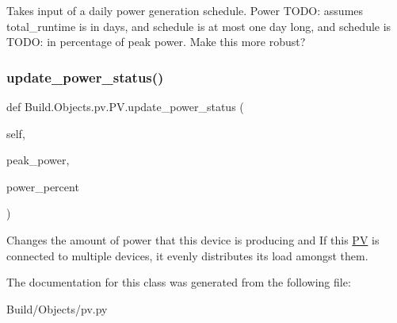 Takes input of a daily power generation schedule. Power T\+O\+DO\+: assumes total\+\_\+runtime is in days, and schedule is at most one day long, and schedule is T\+O\+DO\+: in percentage of peak power. Make this more robust? \mbox{\label{class_build_1_1_objects_1_1pv_1_1_p_v_a0c27298b51f1e227cee28bb3f6528742}} 
\subsubsection{\texorpdfstring{update\+\_\+power\+\_\+status()}{update\_power\_status()}}
{\footnotesize\ttfamily def Build.\+Objects.\+pv.\+P\+V.\+update\+\_\+power\+\_\+status (\begin{DoxyParamCaption}\item[{}]{self,  }\item[{}]{peak\+\_\+power,  }\item[{}]{power\+\_\+percent }\end{DoxyParamCaption})}



Changes the amount of power that this device is producing and If this \hyperlink{class_build_1_1_objects_1_1pv_1_1_p_v}{PV} is connected to multiple devices, it evenly distributes its load amongst them. 



The documentation for this class was generated from the following file\+:\begin{DoxyCompactItemize}
\item 
Build/\+Objects/pv.\+py\end{DoxyCompactItemize}
